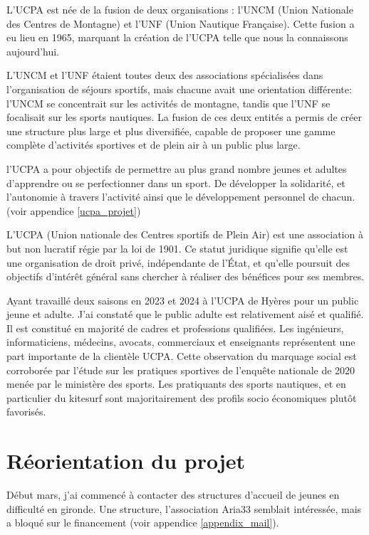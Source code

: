 \documentclass[11pt,a4paper]{report}
\begin{document}
L'UCPA est  née de la fusion de deux organisations : l'UNCM 
(Union Nationale des Centres de Montagne)
et l'UNF (Union Nautique Française). Cette fusion a eu lieu en
1965, marquant la création de l'UCPA telle que nous la connaissons
aujourd'hui.

L'UNCM et l'UNF étaient toutes deux des associations spécialisées
dans l'organisation de séjours sportifs, mais chacune avait une
orientation différente: l'UNCM se concentrait sur les activités 
de montagne, tandis que l'UNF se focalisait sur les sports nautiques. 
La fusion de ces deux entités a permis de créer une structure plus 
large et plus diversifiée, capable de proposer une gamme complète 
d'activités sportives et de plein air à un public plus large.

l'UCPA a pour objectifs de permettre au plus grand nombre jeunes et adultes
d'apprendre ou se perfectionner dans un sport. De développer la solidarité,
et l'autonomie à travers l'activité ainsi que
 le développement personnel de chacun.
(voir appendice \ref{ucpa_projet})


L'UCPA (Union nationale des Centres sportifs de Plein Air) est une association
à but non lucratif régie par la loi de 1901. Ce statut juridique signifie
qu'elle est une organisation de droit privé, indépendante de l'État, et 
qu'elle poursuit des objectifs d'intérêt général sans chercher à 
réaliser des bénéfices pour ses membres.

Ayant travaillé deux saisons en 2023 et 2024 à l'UCPA de Hyères pour 
un public jeune et adulte. J'ai  constaté que le public 
adulte est relativement aisé et qualifié. Il est
constitué en majorité de cadres et professions qualifiées. Les
ingénieurs, informaticiens, médecins, avocats, commerciaux et enseignants
représentent une part importante de la clientèle UCPA.
Cette observation du marquage social  est corroborée par l'étude sur 
les pratiques sportives de l'enqu\^ete nationale de
2020 menée par le ministère des sports\cite{injep}. Les pratiquants
des sports nautiques, et en particulier du kitesurf sont majoritairement
des profils socio économiques plut\^ot favorisés.

\section{Réorientation du projet\label{reorientation}}

Début mars, j'ai commencé à contacter des structures d'accueil de jeunes 
en difficulté en gironde. Une structure, l'association Aria33 semblait 
intéressée, mais a bloqué sur le financement (voir appendice \ref{appendix_mail}).
\end{document}

